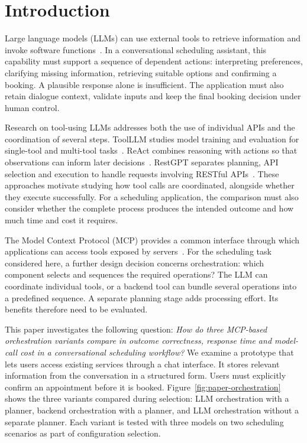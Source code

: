 \section{Introduction}
\label{sec:introduction}

Large language models (LLMs) can use external tools to retrieve information and invoke software functions~\cite{Schick2023Toolformer}.
In a conversational scheduling assistant, this capability must support a sequence of dependent actions: interpreting preferences, clarifying missing information, retrieving suitable options and confirming a booking.
A plausible response alone is insufficient.
The application must also retain dialogue context, validate inputs and keep the final booking decision under human control.

Research on tool-using LLMs addresses both the use of individual APIs and the coordination of several steps.
ToolLLM studies model training and evaluation for single-tool and multi-tool tasks~\cite{qin2024toolllm}.
ReAct combines reasoning with actions so that observations can inform later decisions~\cite{yao2023react}.
RestGPT separates planning, API selection and execution to handle requests involving RESTful APIs~\cite{song2023restgpt}.
These approaches motivate studying how tool calls are coordinated, alongside whether they execute successfully.
For a scheduling application, the comparison must also consider whether the complete process produces the intended outcome and how much time and cost it requires.

The Model Context Protocol (MCP) provides a common interface through which applications can access tools exposed by servers~\cite{MCP2025Architecture}.
For the scheduling task considered here, a further design decision concerns orchestration: which component selects and sequences the required operations?
The LLM can coordinate individual tools, or a backend tool can bundle several operations into a predefined sequence.
A separate planning stage adds processing effort.
Its benefits therefore need to be evaluated.

This paper investigates the following question: \textit{How do three MCP-based orchestration variants compare in outcome correctness, response time and model-call cost in a conversational scheduling workflow?}
We examine a prototype that lets users access existing services through a chat interface.
It stores relevant information from the conversation in a structured form.
Users must explicitly confirm an appointment before it is booked.
Figure~\ref{fig:paper-orchestration} shows the three variants compared during selection: LLM orchestration with a planner, backend orchestration with a planner, and LLM orchestration without a separate planner.
Each variant is tested with three models on two scheduling scenarios as part of configuration selection.

